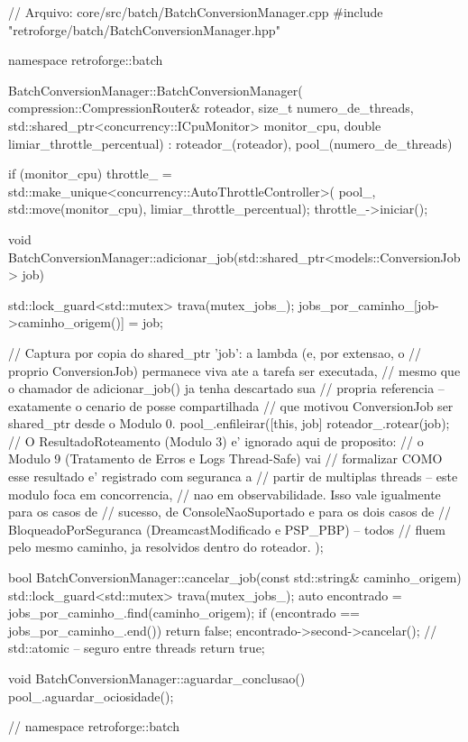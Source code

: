 \begin{CaixaCodigo}
// Arquivo: core/src/batch/BatchConversionManager.cpp
#include "retroforge/batch/BatchConversionManager.hpp"

namespace retroforge::batch {

BatchConversionManager::BatchConversionManager(
    compression::CompressionRouter& roteador, size_t numero_de_threads,
    std::shared_ptr<concurrency::ICpuMonitor> monitor_cpu, double limiar_throttle_percentual)
    : roteador_(roteador), pool_(numero_de_threads) {

    if (monitor_cpu) {
        throttle_ = std::make_unique<concurrency::AutoThrottleController>(
            pool_, std::move(monitor_cpu), limiar_throttle_percentual);
        throttle_->iniciar();
    }
}

void BatchConversionManager::adicionar_job(std::shared_ptr<models::ConversionJob> job) {
    {
        std::lock_guard<std::mutex> trava(mutex_jobs_);
        jobs_por_caminho_[job->caminho_origem()] = job;
    }

    // Captura por copia do shared_ptr 'job': a lambda (e, por extensao, o
    // proprio ConversionJob) permanece viva ate a tarefa ser executada,
    // mesmo que o chamador de adicionar_job() ja tenha descartado sua
    // propria referencia -- exatamente o cenario de posse compartilhada
    // que motivou ConversionJob ser shared_ptr desde o Modulo 0.
    pool_.enfileirar([this, job] {
        roteador_.rotear(job);
        // O ResultadoRoteamento (Modulo 3) e' ignorado aqui de proposito:
        // o Modulo 9 (Tratamento de Erros e Logs Thread-Safe) vai
        // formalizar COMO esse resultado e' registrado com seguranca a
        // partir de multiplas threads -- este modulo foca em concorrencia,
        // nao em observabilidade. Isso vale igualmente para os casos de
        // sucesso, de ConsoleNaoSuportado e para os dois casos de
        // BloqueadoPorSeguranca (DreamcastModificado e PSP_PBP) -- todos
        // fluem pelo mesmo caminho, ja resolvidos dentro do roteador.
    });
}

bool BatchConversionManager::cancelar_job(const std::string& caminho_origem) {
    std::lock_guard<std::mutex> trava(mutex_jobs_);
    auto encontrado = jobs_por_caminho_.find(caminho_origem);
    if (encontrado == jobs_por_caminho_.end()) {
        return false;
    }
    encontrado->second->cancelar(); // std::atomic -- seguro entre threads
    return true;
}

void BatchConversionManager::aguardar_conclusao() {
    pool_.aguardar_ociosidade();
}

} // namespace retroforge::batch
\end{CaixaCodigo}

